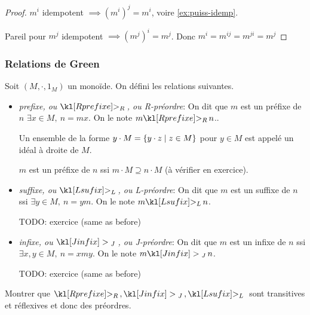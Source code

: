 \begin{proof}
	$m^i$ idempotent $\implies (m^i)^j = m^i$, voire \ref{ex:puiss-idemp}.

	Pareil pour $m^j$ idempotent $\implies (m^j)^i = m^j$.
	Donc $m^i = m^{ij} = m^{ji} = m^{j}$
\end{proof}

\subsubsection{Relations de Green}

\begin{definition}
	Soit $(M,\cdot , 1_M)$ un monoïde. On défini les relations suivantes.

	\begin{itemize}
		\item \emph{prefixe, ou $\geqr$, ou R-préordre}: On dit que $m$ est un préfixe de $n$ \ssi $\exists x \in M, \ n = mx$.
		      On le note $m \geqr n$..

		      Un ensemble de la forme $y \cdot M = \left\{y \cdot z \mid z \in M\right\}$ pour $y \in M$ est appelé un idéal à droite de $M$.

		      $m$ est un préfixe de $n$ ssi $m \cdot M \supseteq n \cdot M$ (à vérifier en exercice).


		\item \emph{suffixe, ou $\geql$, ou L-préordre}: On dit que $m$ est un suffixe de $n$ ssi $\exists y \in M, \ n = ym$.
		      On le note $m \geql n$.

		      TODO: exercice (same as before)


		\item \emph{infixe, ou $\geqj$, ou J-préordre}: On dit que $m$ est un infixe de $n$ ssi $\exists x,y \in M, \ n = xmy$.
		      On le note $m \geqj n$.

		      TODO: exercice (same as before)
	\end{itemize}
\end{definition}

\begin{exercice}
	Montrer que $\geqr,\geqj,\geql$  sont transitives et réflexives et donc des préordres.
\end{exercice}

